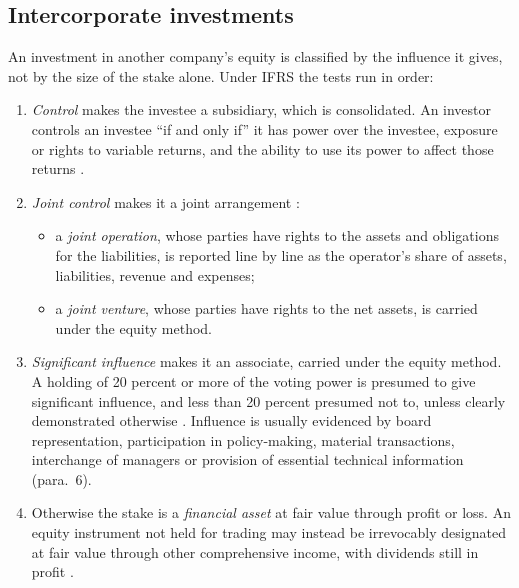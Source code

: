 \subsection{Intercorporate investments}

\begin{qfdefinition}\label{def:intercorporate-investment-classification}
 An investment in another company's equity is classified by the influence it gives, not by the size of the stake alone. Under IFRS the tests run in order:
\begin{enumerate}
\item \emph{Control} makes the investee a subsidiary, which is consolidated. An investor controls an investee ``if and only if'' it has power over the investee, exposure or rights to variable returns, and the ability to use its power to affect those returns \citep[paras.~6--7]{eu-2023-1803-ifrs10}.
\item \emph{Joint control} makes it a joint arrangement \citep[paras.~15--16, 20, 24]{eu-2023-1803-ifrs11}:
\begin{itemize}
\item a \emph{joint operation}, whose parties have rights to the assets and obligations for the liabilities, is reported line by line as the operator's share of assets, liabilities, revenue and expenses;
\item a \emph{joint venture}, whose parties have rights to the net assets, is carried under the equity method.
\end{itemize}
\item \emph{Significant influence} makes it an associate, carried under the equity method. A holding of 20 percent or more of the voting power is presumed to give significant influence, and less than 20 percent presumed not to, unless clearly demonstrated otherwise \citep[para.~5]{eu-2023-1803-ias28}. Influence is usually evidenced by board representation, participation in policy-making, material transactions, interchange of managers or provision of essential technical information (para.~6).
\item Otherwise the stake is a \emph{financial asset} at fair value through profit or loss. An equity instrument not held for trading may instead be irrevocably designated at fair value through other comprehensive income, with dividends still in profit \citep[paras.~5.7.5--5.7.6]{eu-2023-1803-ifrs9}.
\end{enumerate}


\end{qfdefinition}
